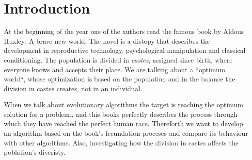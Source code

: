 \section{Introduction}


At the beginning of the year one of the authors read the famous book by Aldous Huxley: A brave new world. The novel
is a distopy that describes the development in reproductive technology, psychological manipulation and classical conditioning.
The population is divided in \textit{castes}, assigned since birth, where everyone knows and accepts their place. We are
talking about a ``optimum world``, whose optimization is based on the population and in the balance the division in 
castes creates, not in an individual.

When we talk about evolutionary algorithms the target is reaching the optimum solution for a problem., and this books
perfectly describes the process through which they have reached the perfect human race. Thereforth we want to develop
an algorithm based on the book's fecundation proceses and compare its behaviour with other algorithms. Also, investigating
how the division in castes affects the poblation's diveristy.


